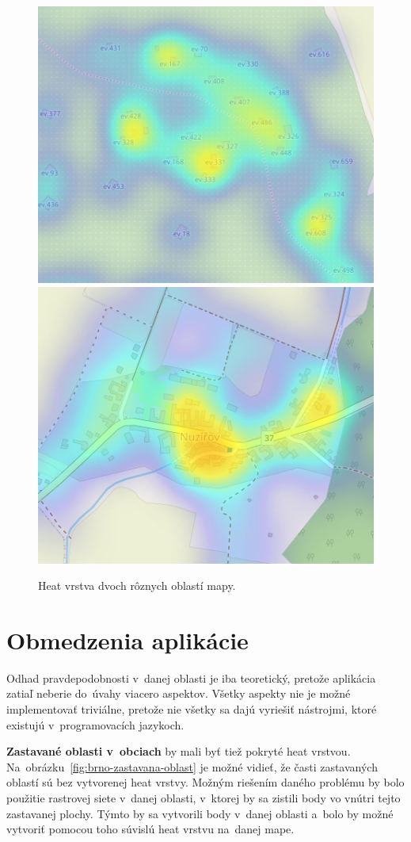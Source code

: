 \begin{figure}
    \centering
    \includegraphics[width=0.48\linewidth]{obrazky-figures/brno-medlanky.png}\hfill
    \includegraphics[width=0.48\linewidth]{obrazky-figures/nuzirov.png}
    \caption{Heat vrstva dvoch rôznych oblastí mapy.}
    \label{fig:output-heat}
\end{figure}


\section{Obmedzenia aplikácie}
Odhad pravdepodobnosti v~danej oblasti je iba teoretický, pretože aplikácia zatiaľ neberie do~úvahy viacero aspektov. Všetky aspekty nie je možné implementovať triviálne, pretože nie všetky sa dajú vyriešiť nástrojmi, ktoré existujú v~programovacích jazykoch.

\textbf{Zastavané oblasti v~obciach} by mali byť tiež pokryté heat vrstvou. Na~obrázku~\ref{fig:brno-zastavana-oblast} je možné vidieť, že časti zastavaných oblastí sú bez vytvorenej heat vrstvy. Možným riešením daného problému by bolo použitie rastrovej siete v~danej oblasti, v~ktorej by sa zistili body vo vnútri tejto zastavanej plochy. Týmto by sa vytvorili body v~danej oblasti a~bolo by možné vytvoriť pomocou toho súvislú heat vrstvu na~danej mape.

